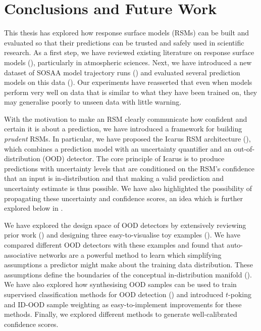 \chapter{Conclusions and Future Work} \label{txt:conclusions-chapter}

This thesis has explored how response surface models (RSMs) can be built and evaluated so that their predictions can be trusted and safely used in scientific research. As a first step, we have reviewed existing literature on response surface models (), particularly in atmospheric sciences. Next, we have introduced a new dataset of SOSAA model trajectory runs () and evaluated several prediction models on this data (). Our experiments have reasserted that even when models perform very well on data that is similar to what they have been trained on, they may generalise poorly to unseen data with little warning.

\newpar With the motivation to make an RSM clearly communicate how confident and certain it is about a prediction, we have introduced a framework for building \textit{prudent} RSMs. In particular, we have proposed the Icarus RSM architecture (), which combines a prediction model with an uncertainty quantifier and an out-of-distribution (OOD) detector. The core principle of Icarus is to produce predictions with uncertainty levels that are conditioned on the RSM's confidence that an input is in-distribution and that making a valid prediction and uncertainty estimate is thus possible. We have also highlighted the possibility of propagating these uncertainty and confidence scores, an idea which is further explored below in .

We have explored the design space of OOD detectors by extensively reviewing prior work () and designing three easy-to-visualise toy examples (). We have compared different OOD detectors with these examples and found that auto-associative networks are a powerful method to learn which simplifying assumptions a predictor might make about the training data distribution. These assumptions define the boundaries of the conceptual in-distribution manifold (). We have also explored how synthesising OOD samples can be used to train supervised classification methods for OOD detection () and introduced $t$-poking and ID-OOD sample weighting as easy-to-implement improvements for these methods. Finally, we explored different methods to generate well-calibrated confidence scores.


